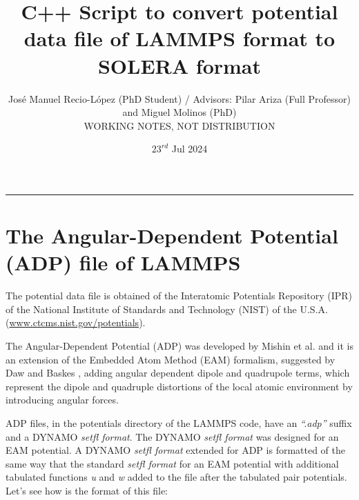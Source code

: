 \documentclass{article}
\title{C++ Script to convert potential data file of LAMMPS format to SOLERA format}
\author{\small José Manuel Recio-López (PhD Student) / Advisors: Pilar Ariza (Full Professor) and Miguel Molinos (PhD) \\ WORKING NOTES, NOT DISTRIBUTION}%
\date{$23^{rd}$ Jul 2024}
\begin{document}
\maketitle

\vspace{0.5cm}
\hrule
\vspace{0.5cm}

\section{The Angular-Dependent Potential (ADP) file of LAMMPS}

The potential data file is obtained of the Interatomic Potentials Repository (IPR) of the National Institute of Standards and Technology (NIST) of the U.S.A. (\href{https://www.ctcms.nist.gov/potentials}{www.ctcms.nist.gov/potentials}). 

The Angular-Dependent Potential (ADP) was developed by Mishin et al. \cite{MisMehPap05,ApoMis11} and it is an extension of the Embedded Atom Method (EAM) formalism, suggested by Daw and Baskes \cite{DawBas84,FoiBasDaw86}, adding angular dependent dipole and quadrupole terms, which represent the dipole and quadruple distortions of the local atomic environment by introducing angular forces.

ADP files, in the potentials directory of the LAMMPS code,  have an \textit{``.adp''} suffix and a DYNAMO \textit{setfl format}. The DYNAMO \textit{setfl format} was designed for an EAM potential. A DYNAMO \textit{setfl format} extended for ADP is formatted of the same way that the standard \textit{setfl format} for an EAM potential with additional tabulated functions \textit{u} and \textit{w} added to the file after the tabulated pair potentials. Let's see how is the format of this file: 
\end{document}
